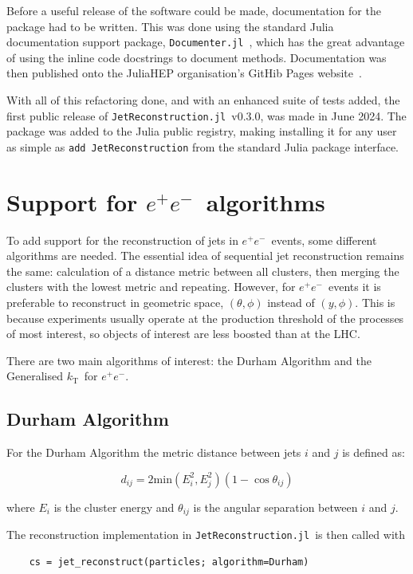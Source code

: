 \documentclass{webofc}
\newcommand{\kt}{${k}_\text{T}$}
\newcommand{\JR}{\texttt{JetReconstruction.jl}}
\newcommand{\ee}{$e^+e^-$}
\begin{document}
Before a useful release of the software could be made, documentation for the
package had to be written. This was done using the standard Julia documentation
support package, \texttt{Documenter.jl}~\cite{documenter-jl}, which has the
great advantage of using the inline code docstrings to document methods.
Documentation was then published onto the JuliaHEP organisation's GitHib Pages
website~\cite{jetreco-docs}.

With all of this refactoring done, and with an enhanced suite of tests added,
the first public release of \JR\, v0.3.0, was made in June 2024. The package was
added to the Julia public registry, making installing it for any user as simple
as \texttt{add JetReconstruction} from the standard Julia package interface.

\section{Support for \ee\ algorithms}
\label{sec:ee}

To add support for the reconstruction of jets in \ee\ events, some different
algorithms are needed. The essential idea of sequential jet reconstruction
remains the same: calculation of a distance metric between all clusters, then
merging the clusters with the lowest metric and repeating. However, for \ee\
events it is preferable to reconstruct in geometric space, $(\theta, \phi)$
instead of $(y, \phi)$. This is because experiments usually operate at the
production threshold of the processes of most interest, so objects of interest
are less boosted than at the LHC.

There are two main algorithms of interest: the Durham Algorithm and the Generalised \kt\ for \ee.

\subsection{Durham Algorithm}
\label{sec:durham}

For the Durham Algorithm the metric distance between jets $i$ and $j$ is defined as:

$$
d_{ij} = 2 \text{min}(E_i^2, E_j^2) (1 - \cos \theta_{ij})
$$

where $E_{i}$ is the cluster energy and $\theta_{ij}$ is the angular separation between $i$ and $j$.

The reconstruction implementation in \JR\ is then called with

\begin{verbatim}
    cs = jet_reconstruct(particles; algorithm=Durham)
\end{verbatim}
\end{document}
